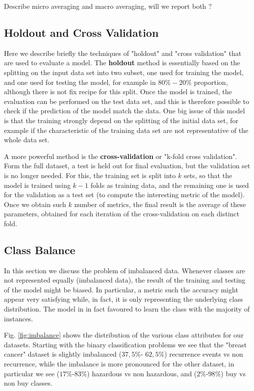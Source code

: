\documentclass{article}
\begin{document}
{\color{red} Describe micro averaging and macro averaging, will we report both ? }


\subsection{Holdout and Cross Validation}\label{sec:cross}
Here we describe briefly the techniques of "holdout" and "cross validation" that are used to evaluate a model. The \textbf{holdout} method is essentially based on the splitting on the input data set into two subset, one used for training the model, and one used for testing the model, for example in $80\%-20\%$ proportion, although there is not fix recipe for this split. Once the model is trained, the evaluation can be performed on the test data set, and this is therefore possible to check if the prediction of the model match the data. One big issue of this model is that the training strongly depend on the splitting of the initial data set, for example if the characteristic of the training data set are not representative of the whole data set.

A more powerful method is the \textbf{cross-validation} or "k-fold cross validation". Form the full dataset, a test is held out for final evaluation, but the validation set is no longer needed. For this, the training set is split into $k$ sets, so that the model is trained using $k-1$ folds as training data, and the remaining one is used for the validation as a test set (to compute the interesting metric of the model).
Once we obtain such $k$ number of metrics, the final result is the average of these parameters, obtained for each iteration of the cross-validation on each distinct fold.

\subsection{Class Balance}\label{sec:balance}
In this section we discuss the problem of imbalanced data. Whenever classes are not represented equally (imbalanced data), the result of the training and testing of the model might be biased. In particular, a metric such the accuracy might appear very satisfying while, in fact, it is only representing the underlying class distribution. The model in in fact favoured to learn the class with the majority of instances.

Fig. \ref{fig:imbalance} shows the distribution of the various class attributes for our datasets. Starting with the binary classification problems we see that the "breast cancer" dataset is slightly imbalanced
($37,5\%$- $62,5\%$) recurrence events vs non recurrence, while the imbalance is more pronounced for the other dataset, in particular we see
($17\%$-$83\%$) hazardous vs non hazardous, and ($2\%$-$98\%$) buy vs  non buy classes.
\end{document}
